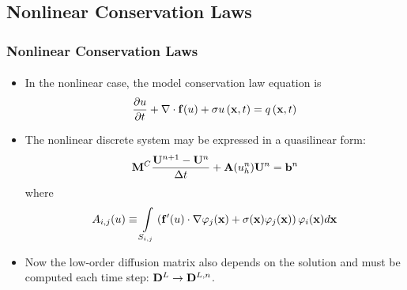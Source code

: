 \documentclass{beamer}
\begin{document}
\subsection{Nonlinear Conservation Laws}
\begin{frame}
\frametitle{Nonlinear Conservation Laws}
\framesubtitle{}

\begin{itemize}
   \item In the nonlinear case, the model conservation law equation is
      \begin{equation}
         \frac{\partial u}{\partial t} + \nabla\cdot\mathbf{f}(u) + \sigma u\left(\mathbf{x},t\right) = q\left(\mathbf{x},t\right)
      \end{equation}
   \item The nonlinear discrete system may be expressed in a quasilinear form:
      \begin{equation}
        \consistentmassmatrix\frac{\solutionvector^{n+1}-\solutionvector^n}{\dt}
          + \ssmatrix(u_h^n)\solutionvector^n = \ssrhs^n
      \end{equation}
      where
      \begin{equation}
         A_{i,j}(u) \equiv \int\limits_{S_{i,j}}\left(
            \mathbf{f}'(u)\cdot\nabla\varphi_j(\mathbf{x}) +
            \sigma(\mathbf{x})\varphi_j(\mathbf{x})\right)\varphi_i(\mathbf{x}) d\mathbf{x}
      \end{equation}
   \item Now the low-order diffusion matrix also depends on the solution
      and must be computed each time step:
      $\diffusionmatrix^L\rightarrow\diffusionmatrix^{L,n}$.
\end{itemize}

\end{frame}
\end{document}
